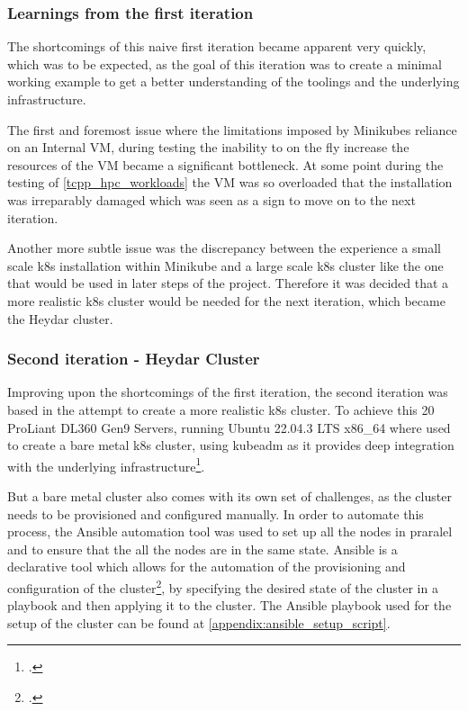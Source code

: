 \subsubsection*{Learnings from the first iteration}

The shortcomings of this naive first iteration became apparent very quickly, 
which was to be expected, as the goal of this iteration was to create a minimal working example to get a better understanding of the toolings and the underlying infrastructure.

The first and foremost issue where the limitations imposed by Minikubes reliance on an Internal \ac{VM},
during testing the inability to on the fly increase the resources of the \ac{VM} became a significant bottleneck.
At some point during the testing of \ref{tcpp_hpc_workloads} the \ac{VM} was so overloaded that the installation was irreparably damaged which was seen as a sign to move on to the next iteration.

Another more subtle issue was the discrepancy between the experience a small scale \ac{k8s} installation within Minikube and a large scale \ac{k8s} cluster like the one that would be used in later steps of the project.
Therefore it was decided that a more realistic \ac{k8s} cluster would be needed for the next iteration, which became the Heydar cluster.

\subsubsection{Second iteration - Heydar Cluster}
\label{heydar_cluster}

Improving upon the shortcomings of the first iteration, the second iteration was based in the attempt to create a more realistic \ac{k8s} cluster.
To achieve this 20 ProLiant DL360 Gen9 Servers, running Ubuntu 22.04.3 LTS x86\_64 where used to create a bare metal \ac{k8s} cluster,
using kubeadm as it provides deep integration with the underlying infrastructure\footcite{CreatingClusterKubeadm}.

But a bare metal cluster also comes with its own set of challenges, as the cluster needs to be provisioned and configured manually.
In order to automate this process, the Ansible automation tool was used to set up all the nodes in praralel and to ensure that the all the nodes are in the same state.
Ansible is a declarative tool which allows for the automation of the provisioning and configuration of the cluster\footcite{Ansible2023}, by specifying the desired state of the cluster in a playbook and then applying it to the cluster.
The Ansible playbook used for the setup of the cluster can be found at \ref{appendix:ansible_setup_script}.

